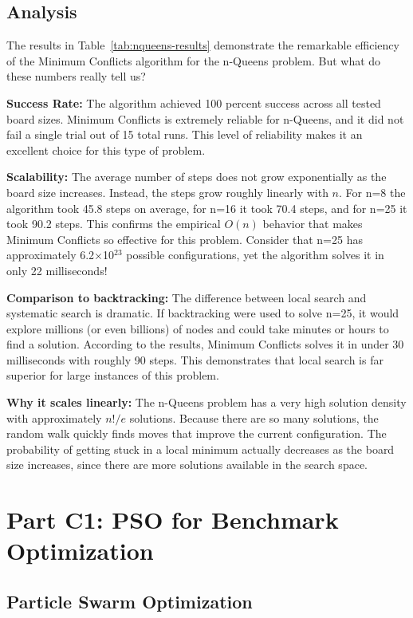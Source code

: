 \documentclass[letterpaper]{article}
\begin{document}
\subsection{Analysis}

The results in Table~\ref{tab:nqueens-results} demonstrate the remarkable efficiency of the Minimum Conflicts algorithm for the n-Queens problem. But what do these numbers really tell us?

\textbf{Success Rate:} The algorithm achieved 100 percent success across all tested board sizes. Minimum Conflicts is extremely reliable for n-Queens, and it did not fail a single trial out of 15 total runs. This level of reliability makes it an excellent choice for this type of problem.

\textbf{Scalability:} The average number of steps does not grow exponentially as the board size increases. Instead, the steps grow roughly linearly with $n$. For n=8 the algorithm took 45.8 steps on average, for n=16 it took 70.4 steps, and for n=25 it took 90.2 steps. This confirms the empirical $O(n)$ behavior that makes Minimum Conflicts so effective for this problem. Consider that n=25 has approximately 6.2×10$^{23}$ possible configurations, yet the algorithm solves it in only 22 milliseconds!

\textbf{Comparison to backtracking:} The difference between local search and systematic search is dramatic. If backtracking were used to solve n=25, it would explore millions (or even billions) of nodes and could take minutes or hours to find a solution. According to the results, Minimum Conflicts solves it in under 30 milliseconds with roughly 90 steps. This demonstrates that local search is far superior for large instances of this problem.

\textbf{Why it scales linearly:} The n-Queens problem has a very high solution density with approximately $n!/e$ solutions. Because there are so many solutions, the random walk quickly finds moves that improve the current configuration. The probability of getting stuck in a local minimum actually decreases as the board size increases, since there are more solutions available in the search space.

\section{Part C1: PSO for Benchmark Optimization}

\subsection{Particle Swarm Optimization}
\end{document}
